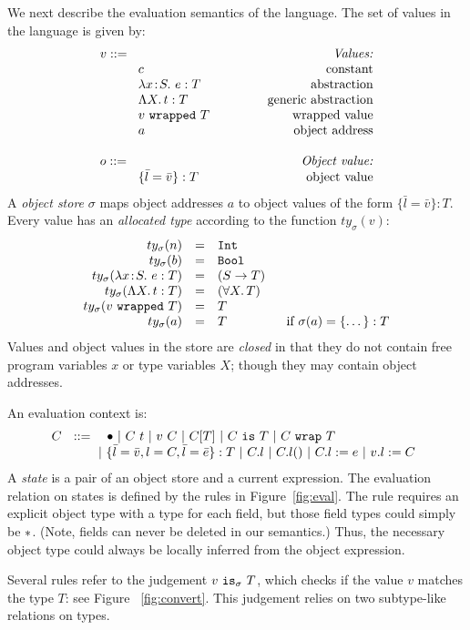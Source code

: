 \documentclass{article}
\newcommand{\lam}[4]{\lambda#1\!:\!#2.\,\,#4:#3}
\newcommand{\lamt}[2]{#1\rightarrow #2}
\newcommand{\app}[2]{#1~#2}
\newcommand{\Int}{\t{Int}}
\newcommand{\Bool}{\t{Bool}}
\newcommand{\dynamic}{\t{*}}
\newcommand{\hole}{\bullet}
\newcommand{\Lam}[3]{\Lambda #1.\,#2:#3}
\newcommand{\App}[2]{#1[#2]}
\newcommand{\Lamt}[2]{\forall #1.\,#2}
\newcommand{\cast}[2]{#1~\t{is}~#2}
\renewcommand{\t}[1]{{\tt #1}}
\newcommand{\obje}[2]{\{#1\}:{#2}}
\newcommand{\objget}[2]{#1.#2}
\newcommand{\objcall}[2]{#1.#2()}
\newcommand{\objset}[3]{#1.#2:=#3}
\newcommand{\wrapv}[2]{#1~\t{wrapped}~#2}
\newcommand{\wrap}[2]{#1~\t{wrap}~#2}
\newcommand{\allocty}[1]{ty_{\sigma}(#1)}
\newcommand{\istype}[2]{#1~\t{is}_{\sigma}~ #2}
\begin{document}
We next describe the evaluation semantics of the language. 
The set of values in the language is given by:
\[
\begin{array}{llr}
	\mydefhead{v ::=\qquad\qquad\qquad\qquad\qquad}{Values:} 
	\mydefcase{c								}{constant} 
	\mydefcase{\lam{x}{S}{T}{e} 				}{abstraction} 
	\mydefcase{\Lam{X}{t}{T}					}{generic abstraction} 
	\mydefcase{\wrapv{v}{T}	 				}{wrapped value} 
	\mydefcase{a								}{object address}
	\\
	\mydefhead{o ::=\qquad\qquad\qquad\qquad\qquad}{Object value:} 
	\mydefcase{\obje{\bar l = \bar v}{T}		}{object value}
\end{array}
\]
A \emph{object store} $\sigma$ maps object addresses $a$ to object values of the form $\obje{\bar{l}=\bar v}{T}$.
Every value has an \emph{allocated type} according to the function $\allocty{v}$:
\[
\begin{array}{rcll}
		\allocty{n}&=&\Int \\
		\allocty{b}&=&\Bool\\
		\allocty{\lam{x}{S}{T}{e}}&=&(\lamt{S}{T})\\
		\allocty{\Lam{X}{t}{T}}&=&(\Lamt{X}{T})\\
		\allocty{\wrapv{v}{T}}&=&T\\
		\allocty{a}&=&T   &\mbox{~~if } 		\sigma(a)=\obje{\dots}{T}
\end{array}
\]
Values and object values in the store are \emph{closed} in that they do not contain free program variables $x$ or type variables $X$;
though they may contain object addresses.

An evaluation context is:
\[
C ~~::=
\begin{array}[t]{@{}l}
		~~~\hole
	~|~	\app{C}{t} 
	~|~	\app{v}{C}
	~|~	\App{C}{T} 
	~|~ \cast{C}{T} 
	~|~ \wrap{C}{T} \\
	~|~ \obje{\bar l=\bar v,l=C, \bar l =\bar e}{T}
	~|~ \objget{C}{l}
	~|~ \objcall{C}{l}
	~|~ \objset{C}{l}{e}
	~|~ \objset{v}{l}{C} 
\end{array}
\]
A \emph{state} is a pair of an object store and a current expression.
The evaluation relation on states is defined by the rules in Figure~\ref{fig:eval}.
The rule  requires an explicit object type with a type for each field,
but those field types could simply be $\dynamic$. (Note, fields can never be deleted in our semantics.)
Thus, the necessary object type could always be locally inferred from the object expression.

Several rules refer to the judgement $\istype{v}{T}$, which checks if the value $v$ matches the type $T$: 
see  Figure ~\ref{fig:convert}. This judgement relies on two subtype-like relations on types.
\end{document}
